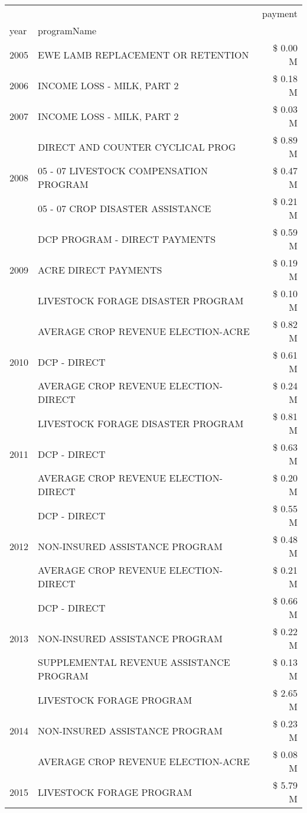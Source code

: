 \begin{tabular}{llr}
\toprule
 &  & payment \\
year & programName &  \\
\midrule
2005 & EWE LAMB REPLACEMENT OR RETENTION & \$ 0.00 M \\
\cline{1-3}
2006 & INCOME LOSS - MILK, PART 2 & \$ 0.18 M \\
\cline{1-3}
2007 & INCOME LOSS - MILK, PART 2 & \$ 0.03 M \\
\cline{1-3}
\multirow[t]{3}{*}{2008} & DIRECT AND COUNTER CYCLICAL PROG & \$ 0.89 M \\
 & 05 - 07 LIVESTOCK COMPENSATION PROGRAM & \$ 0.47 M \\
 & 05 - 07 CROP DISASTER ASSISTANCE & \$ 0.21 M \\
\cline{1-3}
\multirow[t]{3}{*}{2009} & DCP PROGRAM - DIRECT PAYMENTS & \$ 0.59 M \\
 & ACRE DIRECT PAYMENTS & \$ 0.19 M \\
 & LIVESTOCK FORAGE DISASTER  PROGRAM & \$ 0.10 M \\
\cline{1-3}
\multirow[t]{3}{*}{2010} & AVERAGE CROP REVENUE ELECTION-ACRE & \$ 0.82 M \\
 & DCP - DIRECT & \$ 0.61 M \\
 & AVERAGE CROP REVENUE ELECTION-DIRECT & \$ 0.24 M \\
\cline{1-3}
\multirow[t]{3}{*}{2011} & LIVESTOCK FORAGE DISASTER PROGRAM & \$ 0.81 M \\
 & DCP - DIRECT & \$ 0.63 M \\
 & AVERAGE CROP REVENUE ELECTION-DIRECT & \$ 0.20 M \\
\cline{1-3}
\multirow[t]{3}{*}{2012} & DCP - DIRECT & \$ 0.55 M \\
 & NON-INSURED ASSISTANCE PROGRAM & \$ 0.48 M \\
 & AVERAGE CROP REVENUE ELECTION-DIRECT & \$ 0.21 M \\
\cline{1-3}
\multirow[t]{3}{*}{2013} & DCP - DIRECT & \$ 0.66 M \\
 & NON-INSURED ASSISTANCE PROGRAM & \$ 0.22 M \\
 & SUPPLEMENTAL REVENUE ASSISTANCE PROGRAM & \$ 0.13 M \\
\cline{1-3}
\multirow[t]{3}{*}{2014} & LIVESTOCK FORAGE PROGRAM & \$ 2.65 M \\
 & NON-INSURED ASSISTANCE PROGRAM & \$ 0.23 M \\
 & AVERAGE CROP REVENUE ELECTION-ACRE & \$ 0.08 M \\
\cline{1-3}
\multirow[t]{3}{*}{2015} & LIVESTOCK FORAGE PROGRAM & \$ 5.79 M \\

\end{tabular}
